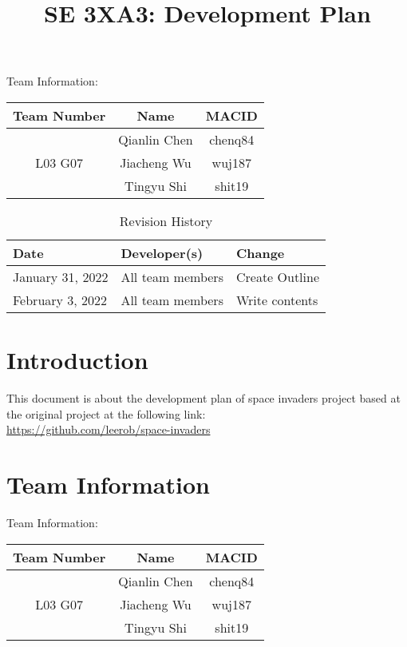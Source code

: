 \documentclass[12pt]{article}
\title{SE 3XA3: Development Plan}
\begin{document}
\maketitle

{\Large Team Information:}
\begin{table}[htp]
\centering
{\Large
\begin{tabular}{|c|c|c|}
\hline
\multicolumn{1}{|l|}{Team Number} & Name         & MACID   \\ \hline
\multirow{3}{*}{L03 G07}          & Qianlin Chen & chenq84 \\ \cline{2-3} 
                                  & Jiacheng Wu  & wuj187  \\ \cline{2-3} 
                                  & Tingyu Shi   & shit19  \\ \hline
\end{tabular}
}
\end{table}

\begin{table}[htp]
\caption{Revision History} 
\begin{tabularx}{\textwidth}{llX}
\toprule
\textbf{Date} & \textbf{Developer(s)} & \textbf{Change}\\
\midrule
January 31, 2022 & All team members & Create Outline\\
February 3, 2022 & All team members & Write contents\\
\bottomrule
\end{tabularx}
\end{table}

\newpage

\section{Introduction}
\noindent This document is about the
development plan of space invaders project
based at the original project at the
following link:\\
\url{https://github.com/leerob/space-invaders}
\section{Team Information}
{\Large Team Information:}
\begin{table}[htp]
\centering
{\Large
\begin{tabular}{|c|c|c|}
\hline
\multicolumn{1}{|l|}{Team Number} & Name         & MACID   \\ \hline
\multirow{3}{*}{L03 G07}          & Qianlin Chen & chenq84 \\ \cline{2-3} 
                                  & Jiacheng Wu  & wuj187  \\ \cline{2-3} 
                                  & Tingyu Shi   & shit19  \\ \hline
\end{tabular}
}
\end{table}
\end{document}
